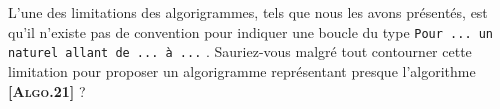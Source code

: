 L'une des limitations des algorigrammes, tels que nous les avons présentés, est qu'il n'existe pas de convention pour indiquer une boucle du type \verb+Pour ... un naturel allant de ... à ...+ {}. Sauriez-vous malgré tout contourner cette limitation pour proposer un algorigramme représentant \og presque \fg{} l'algorithme {\small\textbf{\textsc{[Algo.21]}}} ?